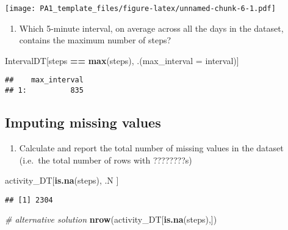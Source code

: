 \documentclass[]{article}
\newenvironment{Shaded}{\begin{snugshade}}{\end{snugshade}}
\newcommand{\KeywordTok}[1]{\textcolor[rgb]{0.13,0.29,0.53}{\textbf{#1}}}
\newcommand{\DataTypeTok}[1]{\textcolor[rgb]{0.13,0.29,0.53}{#1}}
\newcommand{\StringTok}[1]{\textcolor[rgb]{0.31,0.60,0.02}{#1}}
\newcommand{\CommentTok}[1]{\textcolor[rgb]{0.56,0.35,0.01}{\textit{#1}}}
\newcommand{\OperatorTok}[1]{\textcolor[rgb]{0.81,0.36,0.00}{\textbf{#1}}}
\newcommand{\NormalTok}[1]{#1}
\providecommand{\tightlist}{%
  \setlength{\itemsep}{0pt}\setlength{\parskip}{0pt}}
\begin{document}
\texttt{[image: PA1\_template\_files/figure-latex/unnamed-chunk-6-1.pdf]}

\begin{enumerate}
\def\labelenumi{\arabic{enumi}.}
\setcounter{enumi}{1}
\tightlist
\item
  Which 5-minute interval, on average across all the days in the
  dataset, contains the maximum number of steps?
\end{enumerate}

\begin{Shaded}
\begin{Highlighting}[]
\NormalTok{IntervalDT[steps }\OperatorTok{==}\StringTok{ }\KeywordTok{max}\NormalTok{(steps), .(}\DataTypeTok{max_interval =}\NormalTok{ interval)]}
\end{Highlighting}
\end{Shaded}

\begin{verbatim}
##    max_interval
## 1:          835
\end{verbatim}

\subsection{Imputing missing values}\label{imputing-missing-values}

\begin{enumerate}
\def\labelenumi{\arabic{enumi}.}
\tightlist
\item
  Calculate and report the total number of missing values in the dataset
  (i.e.~the total number of rows with ????????s)
\end{enumerate}

\begin{Shaded}
\begin{Highlighting}[]
\NormalTok{activity_DT[}\KeywordTok{is.na}\NormalTok{(steps), .N ]}
\end{Highlighting}
\end{Shaded}

\begin{verbatim}
## [1] 2304
\end{verbatim}

\begin{Shaded}
\begin{Highlighting}[]
\CommentTok{# alternative solution}
\KeywordTok{nrow}\NormalTok{(activity_DT[}\KeywordTok{is.na}\NormalTok{(steps),])}
\end{Highlighting}
\end{Shaded}
\end{document}
